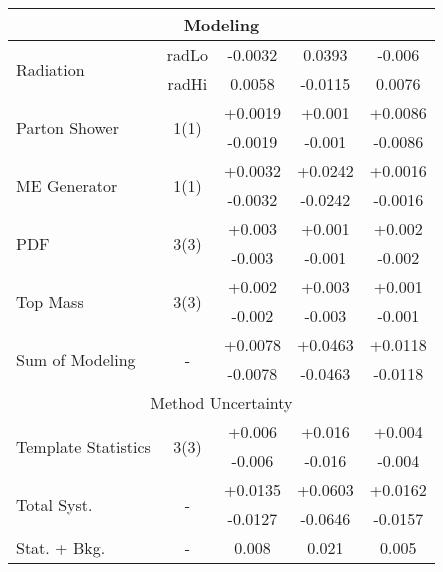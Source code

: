 \begin{table}[h!]
\begin{tabular}{lcccc}
\hline
\multicolumn{5}{c}{Modeling} \\\hline
\multirow{2}{*}{Radiation} & radLo & -0.0032 & 0.0393 & -0.006\\
                           & radHi & 0.0058 & -0.0115 & 0.0076\\ \hline
\multirow{2}{*}{Parton Shower} & \multirow{2}{*}{1(1)} & +0.0019 & +0.001 & +0.0086\\
                      &                       & -0.0019 & -0.001 & -0.0086\\\hline
\multirow{2}{*}{ME Generator} & \multirow{2}{*}{1(1)} & +0.0032 & +0.0242 & +0.0016\\
                      &                       & -0.0032 & -0.0242 & -0.0016\\\hline
\multirow{2}{*}{PDF} & \multirow{2}{*}{3(3)} & +0.003 & +0.001 & +0.002\\
                      &                       & -0.003 & -0.001 & -0.002\\\hline
\multirow{2}{*}{Top Mass} & \multirow{2}{*}{3(3)} & +0.002 & +0.003 & +0.001\\
                      &                       & -0.002 & -0.003 & -0.001\\\hline

\hline\hline
\multirow{2}{*}{Sum of Modeling} & \multirow{2}{*}{-} & +0.0078 & +0.0463 & +0.0118\\
                      &                       & -0.0078 & -0.0463 & -0.0118\\\hline

\hline
\multicolumn{5}{c}{Method Uncertainty} \\\hline
\multirow{2}{*}{Template Statistics} & \multirow{2}{*}{3(3)} & +0.006 & +0.016 & +0.004\\
                      &                       & -0.006 & -0.016 & -0.004\\\hline

\hline\hline
\multirow{2}{*}{Total Syst.} & \multirow{2}{*}{-} & +0.0135 & +0.0603 & +0.0162\\
                      &                       & -0.0127 & -0.0646 & -0.0157\\\hline
Stat. + Bkg. & - & 0.008 & 0.021 & 0.005 \\\hline

\hline\hline
\end{tabular}


\end{table}
